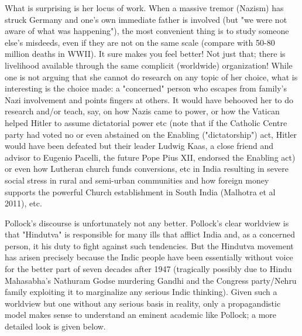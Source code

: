 What is surprising is her locus of work. When a massive tremor (Nazism) has struck Germany and one's own immediate father is involved (but "we were not aware of what was happening"), the most convenient thing is to study someone else's misdeeds, even if they are not on the same scale (compare with 50-80 million deaths in WWII). It sure makes you feel better! Not just that; there is livelihood available through the same complicit (worldwide) organization! While one is not arguing that she cannot do research on any topic of her choice, what is interesting is the choice made: a "concerned" person who escapes from family’s Nazi involvement and points fingers at others. It would have behooved her to do research and/or teach, say, on how Nazis came to power, or how the Vatican helped Hitler to assume dictatorial power etc (note that if the Catholic Centre party had voted no or even abstained on the Enabling ("dictatorship") act, Hitler would have been defeated but their leader Ludwig Kaas, a close friend and advisor to Eugenio Pacelli, the future Pope Pius XII, endorsed the Enabling act) or even how Lutheran church funds conversions, etc in India resulting in severe social stress in rural and semi-urban communities and how foreign money supports the powerful Church establishment in South India (Malhotra et al 2011), etc. 

Pollock's discourse is unfortunately not any better. Pollock's clear worldview is that "Hindutva" is responsible for many ills that afflict India and, as a concerned person, it his duty to fight against such tendencies. But the Hindutva movement has arisen precisely because the Indic people have been essentially without voice for the better part of seven decades after 1947 (tragically possibly due to Hindu Mahasabha’s Nathuram Godse murdering Gandhi and the Congress party/Nehru family exploiting it to marginalize any serious Indic thinking).  Given such a worldview but one without any serious basis in reality, only a propagandistic model makes sense to understand an eminent academic like Pollock; a more detailed look is given below.

